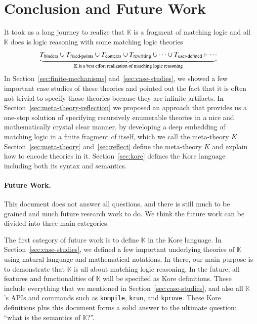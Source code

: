 \documentclass[UTF8,11pt]{article}
\theoremstyle{plain}
\theoremstyle{definition}
\theoremstyle{remark}
\newcommand{\K}{\mbox{$\mathbb{K}$}\xspace}
\begin{document}

\section{Conclusion and Future Work}
It took us a long journey to realize that \K is a fragment of matching logic
and all \K does is logic reasoning with some matching logic theories
$$
\underbrace{T_\textrm{binders} \cup
T_\textrm{fixed-points} \cup
T_\textrm{contexts} \cup
T_\textrm{rewriting} \cup
\cdots \cup
T_\textrm{user-defined} \vdash \cdots}_
\text{\K is a best effort realization of matching logic reasoning}
$$
In Section~\ref{sec:finite-mechanisms} and~\ref{sec:case-studies}, we showed a
few important case studies of these theories and pointed out the fact that
it is often not trivial to specify those theories because they are infinite
artifacts.
In Section~\ref{sec:meta-theory-reflection} we proposed an approach that
provides us a one-stop solution of specifying recursively enumerable theories
in a nice and mathematically crystal clear manner, by developing a deep
embedding of matching logic in a finite fragment of itself, which we call the
meta-theory $K$.
Section~\ref{sec:meta-theory} and~\ref{sec:reflect} define the meta-theory $K$
and explain how to encode theories in it.
Section~\ref{sec:kore} defines the Kore language including both its syntax and
semantics.

\paragraph{Future Work.}
This document does not answer all questions, and there is still much to be
grained and much future research work to do.
We think the future work can be divided into three main categories.

The first category of future work is to define \K in the Kore language.
In Section~\ref{sec:case-studies}, we defined a few important underlying
theories of \K using natural language and mathematical notations.
In there, our main purpose is to demonstrate that \K is all about matching
logic reasoning.
In the future, all features and functionalities of \K will be specified as
Kore definitions.
These include everything that we mentioned in Section~\ref{sec:case-studies},
and also all \K's APIs and commands such as
\texttt{kompile}, \texttt{krun}, and \texttt{kprove}.
These Kore definitions plus this document forms a solid answer to the ultimate
question: ``what is the semantics of \K?''.
\end{document}
